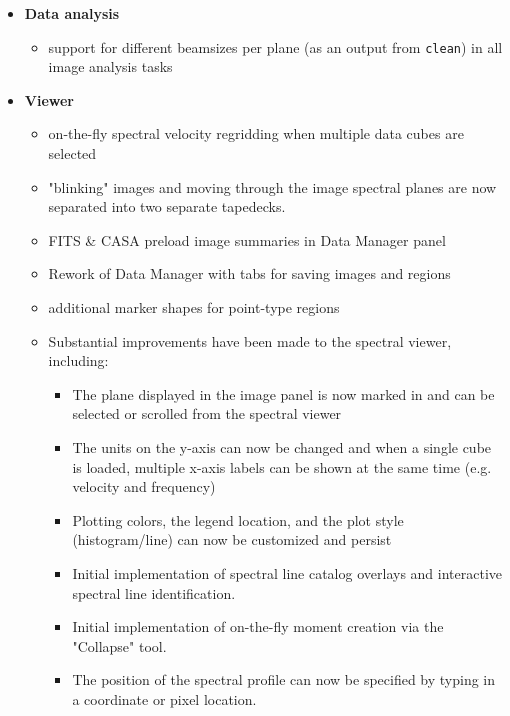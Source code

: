 \begin{itemize}
\begin{itemize}
\end{itemize}

\item  {\bf Data analysis}
\begin{itemize}
   \item  support for different beamsizes per plane (as an output from {\tt clean}) in all image analysis tasks
 

\end{itemize}

\item  {\bf Viewer}

\begin{itemize}

    \item  on-the-fly spectral velocity regridding when multiple data cubes are selected 
    \item  "blinking" images and moving through the image spectral planes are now separated into two separate tapedecks. 
    \item  FITS \& CASA preload image summaries in Data Manager panel
    \item  Rework of Data Manager with tabs for saving images and regions
    \item  additional marker shapes for point-type regions
    \item  Substantial improvements have been made to the spectral viewer, including:
       \begin{itemize}
      \item  The plane displayed in the image panel is now marked in and can be selected or scrolled from the spectral viewer
      \item  The units on the y-axis can now be changed and when a single cube is loaded, multiple x-axis labels can be shown at the same time (e.g. velocity and frequency)
      \item  Plotting colors, the legend location, and the plot style (histogram/line) can now be customized and persist
      \item  Initial implementation of spectral line catalog overlays and interactive spectral line identification.
      \item  Initial implementation of on-the-fly moment creation via the "Collapse" tool.
      \item  The position of the spectral profile can now be specified by typing in a coordinate or pixel location.
 
      \end{itemize}


\end{itemize}
\end{itemize}
